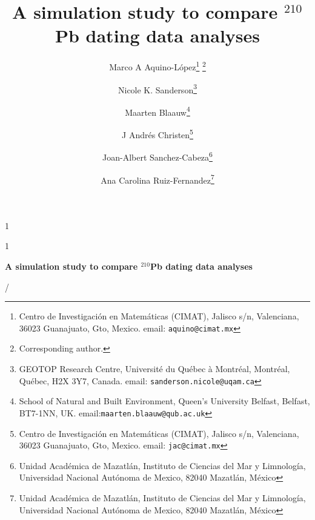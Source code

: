 \documentclass [10pt] {article}
\date{ }
\newcommand{\blind}{1}
\newcommand{\papertitle}{
 A simulation study to compare $^{210}$Pb dating data analyses 
}
\begin{document}
	\def\spacingset#1{\renewcommand{\baselinestretch}%
		{#1}\small\normalsize} \spacingset{1}
	\blind
	{
		\title{\textbf{\papertitle}}

		\author{Marco A Aquino-L\'opez\thanks{
				Centro de Investigaci\'on en Matem\'aticas (CIMAT),
				Jalisco s/n, Valenciana, 36023 Guanajuato, Gto, Mexico.
				email: \texttt{aquino@cimat.mx} } \thanks{Corresponding author.}
					\and
			Nicole K. Sanderson\thanks{
				GEOTOP Research Centre, Université du Québec à Montréal, 
				Montréal, Québec, H2X 3Y7, Canada. 
				email: \texttt{sanderson.nicole@uqam.ca}}
					\and
			Maarten Blaauw\thanks{School of Natural and Built Environment,
				Queen's University Belfast,
				Belfast, BT7-1NN, UK.
				email:\texttt{maarten.blaauw@qub.ac.uk}  }
					\and
			J Andr\'es Christen\thanks{
				Centro de Investigaci\'on en Matem\'aticas (CIMAT),
				Jalisco s/n, Valenciana, 36023 Guanajuato, Gto, Mexico.
				email: \texttt{jac@cimat.mx}  }
					\and
			Joan-Albert Sanchez-Cabeza\thanks{
				Unidad Acad\'emica de Mazatl\'an, 
				Instituto de Ciencias del Mar y Limnolog\'ia, 
				Universidad Nacional Aut\'onoma de Mexico, 
				82040 Mazatl\'an, M\'exico}
					\and
			Ana Carolina Ruiz-Fernandez\thanks{
				Unidad Acad\'emica de Mazatl\'an, 
				Instituto de Ciencias del Mar y Limnolog\'ia, 
				Universidad Nacional Aut\'onoma de Mexico, 
				82040 Mazatl\'an, M\'exico}


			}
		\maketitle
	} \fi

	\blind
	{
		\bigskip
		\bigskip
		\bigskip
		\begin{center}
			{\LARGE\bf \papertitle}
		\end{center}
		\medskip/
	} \fi
\end{document}
